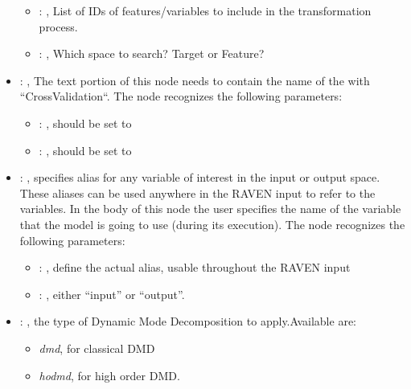 \begin{itemize}
\begin{itemize}
        \item {}: , 
          List of IDs of features/variables to include in the transformation process.

        \item {}: , 
          Which space to search? Target or Feature?
      \end{itemize}

    \item {}: , 
      The text portion of this node needs to contain the name of the  with
               ``CrossValidation``.
      The  node recognizes the following parameters:
        \begin{itemize}
          \item {}: , 
            should be set to 
          \item {}: , 
            should be set to 
      \end{itemize}

    \item {}: , 
      specifies alias for         any variable of interest in the input or output space. These
      aliases can be used anywhere in the RAVEN input to         refer to the variables. In the body
      of this node the user specifies the name of the variable that the model is going to use
      (during its execution).
      The  node recognizes the following parameters:
        \begin{itemize}
          \item {}: , 
            define the actual alias, usable throughout the RAVEN input
          \item {}: , 
            either ``input'' or ``output''.
      \end{itemize}

    \item {}: , 
      the type of Dynamic Mode Decomposition to apply.Available are:
      \begin{itemize}                                                     \item \textit{dmd}, for
      classical DMD                                                     \item \textit{hodmd}, for
      high order DMD.                                                   \end{itemize}


\end{itemize}
